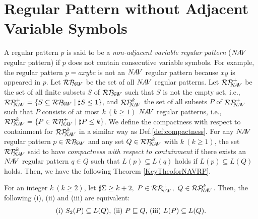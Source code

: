 \section{Regular Pattern without Adjacent Variable Symbols}

A regular pattern $p$ is said to be a {\it non-adjacent variable regular pattern} ($N\!A\!V$ regular pattern)  
if $p$ does not contain consecutive variable symbols.
For example, the regular pattern $p=axybc$ is not an $N\!A\!V$ regular pattern because $xy$ is appeared in $p$.
Let $\mathcal{RP}_{\!\!\!N\!\!A\!V}$ be the set of all $N\!A\!V$ regular patterns.
Let $\mathcal{RP}^{+}_{\!\!\!N\!A\!V}$ be the set of all finite subsets $S$ of $\mathcal{RP}_{\!\!\!N\!\!A\!V}$ such that $S$ is not the empty set, i.e., $\NAVRPplus=\{S \subseteq \NAVRP \mid \sharp S \leq 1\}$,
and $\mathcal{RP}^{k}_{\!\!\!N\!A\!V}$ the set of all subsets $P$ of $\mathcal{RP}^{+}_{\!\!\!N\!A\!V}$ such that $P$ consists of at most $k~(k\geq 1)$ $N\!A\!V$ regular patterns, i.e., $\NAVRPkei=\{P\in \NAVRPplus \mid \sharp P \leq k\}$.
We define the compactness with respect to containment for $\mathcal{RP}^{k}_{\!\!\!N\!A\!V}$ in a similar way as Def.\ref{def:compactness}.
 For any $N\!A\!V$ regular pattern $p \in \mathcal{RP}_{\!\!\!N\!\!A\!V}$ and any set $Q \in \mathcal{RP}^{k}_{\!\!\!N\!A\!V}$ with $k~(k\geq 1)$,
  the set $\mathcal{RP}^{k}_{\!\!\!N\!A\!V}$ said to have {\it compactness with respect to containment}
  if there exists an $N\!A\!V$ regular pattern $q \in Q$ such that $L(p) \subseteq L(q)$ holds if $L(p) \subseteq L(Q)$ holds.
Then, we have the following Theorem \ref{KeyTheoforNAVRP}.

\begin{thm}\label{KeyTheoforNAVRP}%
For an integer $k~(k\ge 2)$, let $\sharp \Sigma \ge k+2,~P\in \NAVRPplus,~Q \in \NAVRPkei$.  
Then, the following (i), (ii) and (iii) are equivalent:
\[
\begin{tabular}{ll}
(i) $S_{2}(P) \subseteq L(Q)$,
(ii) $P \sqsubseteq Q$,
(iii) $L(P) \subseteq L(Q)$.
\end{tabular}
\]
\end{thm}

